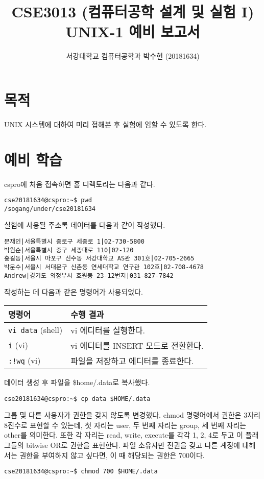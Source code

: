 \documentclass[runningheads]{llncs}
\begin{document}
\title{CSE3013 (컴퓨터공학 설계 및 실험 I) \space \newline UNIX-1 예비 보고서}
\author{서강대학교 컴퓨터공학과 박수현 (20181634)}
\maketitle

\section{목적}
UNIX 시스템에 대하여 미리 접해본 후 실험에 임할 수 있도록 한다.

\section{예비 학습}
cspro에 처음 접속하면 홈 디렉토리는 다음과 같다.
\begin{verbatim}
cse20181634@cspro:~$ pwd
/sogang/under/cse20181634
\end{verbatim}

실험에 사용될 주소록 데이터를 다음과 같이 작성했다.
\begin{verbatim}
문재인|서울특별시 종로구 세종로 1|02-730-5800
박원순|서울특별시 중구 세종대로 110|02-120
홍길동|서울시 마포구 신수동 서강대학교 AS관 301호|02-705-2665
박문수|서울시 서대문구 신촌동 연세대학교 연구관 102호|02-708-4678
Andrew|경기도 의정부시 호원동 23-12번지|031-827-7842
\end{verbatim}

작성하는 데 다음과 같은 명령어가 사용되었다.

\begin{tabular}{l|l}
	명령어 & 수행 결과 \\
	\hline
	\texttt{vi data} (shell) & vi 에디터를 실행한다. \\
	\texttt{i} (vi) & vi 에디터를 INSERT 모드로 전환한다. \\
	\texttt{:!wq} (vi) & 파일을 저장하고 에디터를 종료한다.
\end{tabular}

데이터 생성 후 파일을 \$home/.data로 복사했다.

\begin{verbatim}
cse20181634@cspro:~$ cp data $HOME/.data
\end{verbatim}

그룹 및 다른 사용자가 권한을 갖지 않도록 변경했다. chmod 명령어에서 권한은 3자리 8진수로 표현할 수 있는데, 첫 자리는 user, 두 번째 자리는 group, 세 번째 자리는 other를 의미한다. 또한 각 자리는 read, write, execute를 각각 1, 2, 4로 두고 이 플래그들의 bitwise OR로 권한을 표현한다. 파일 소유자만 전권을 갖고 다른 계정에 대해서는 권한을 부여하지 않고 싶다면, 이 때 해당되는 권한은 700이다.
\begin{verbatim}
cse20181634@cspro:~$ chmod 700 $HOME/.data
\end{verbatim}
\end{document}

